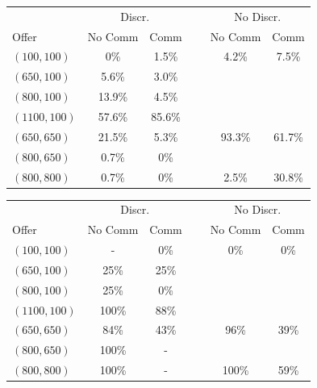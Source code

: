 \documentclass{beamer}
\begin{document}
\begin{frame}
\begin{card}
	\begin{tabular}{lccccc}\toprule
			&  \multicolumn{2}{c}{Discr.} &\  & \multicolumn{2}{c}{No Discr.}\\\cline{2-3} \cline{5-6}
			\multicolumn{1}{l}{Offer}  & \multicolumn{1}{c}{No Comm} & \multicolumn{1}{c}{Comm}  & & \multicolumn{1}{c}{No Comm} & \multicolumn{1}{c}{Comm}\\ \midrule
			$(100,100)$  &  0\%  & 1.5\%  & & 4.2\%  & 7.5\% \\
			$(650,100)$  &  5.6\%  & 3.0\%  \\
			$(800,100)$  &  13.9\%  & 4.5\%  \\
			$(1100,100)$ &  57.6\%  & 85.6\% \\ 
			$(650,650)$  &  21.5\%  & 5.3\% & & 93.3\%  & 61.7\%  \\ 
			$(800,650)$  &  0.7\%  & 0\%  \\ 
			$(800,800)$  &  0.7\%  & 0\% & & 2.5\%  & 30.8\% \\ \bottomrule
		\end{tabular}
\end{card}
\end{frame}

\begin{frame}
\begin{card}

	\begin{tabular}{lccccc}\toprule
			&  \multicolumn{2}{c}{Discr.} &\  & \multicolumn{2}{c}{No Discr.}\\\cline{2-3} \cline{5-6}
			\multicolumn{1}{l}{Offer}  & \multicolumn{1}{c}{No Comm} & \multicolumn{1}{c}{Comm}  & & \multicolumn{1}{c}{No Comm} & \multicolumn{1}{c}{Comm}\\ \midrule
			$(100,100)$  &  -  & 0\%  & & 0\%  &0\% \\
			$(650,100)$  &  25\%  & 25\%  \\
			$(800,100)$  &  25\%  & 0\%  \\
			$(1100,100)$ &  100\%  & 88\% \\ 
			$(650,650)$  &  84\%  & 43\% & & 96\%  & 39\%  \\ 
			$(800,650)$  &  100\%  & -  \\ 
			$(800,800)$  &  100\%  & - & & 100\%  & 59\% \\ \bottomrule
		\end{tabular}
\end{card}
\end{frame}
\end{document}

